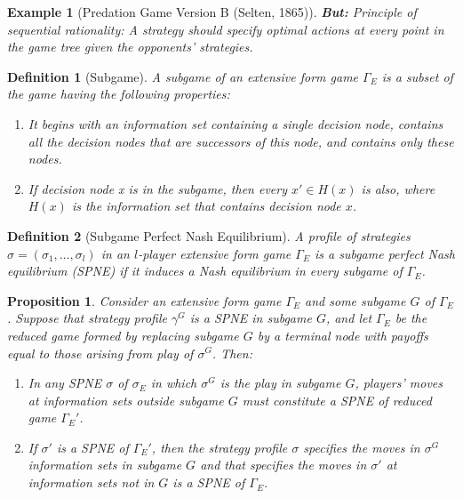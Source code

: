 \documentclass[12pt]{extreport} %
\theoremstyle{named}
\theoremstyle{itshape}
\newtheorem*{definition}{Definition}
\theoremstyle{normal}
\newtheorem{example}[unnamedtheorem]{Example}
\newtheorem{proposition}[unnamedtheorem]{Proposition}
\begin{document}
\begin{example}[Predation Game Version B (Selten, 1865)]
	\textbf{But:} Principle of sequential rationality: A strategy should specify optimal actions at every point in the game tree given the opponents’ strategies.
\end{example}

\begin{definition}[Subgame]
	A subgame of an extensive form game $\Gamma_E$ is a subset of the game having the following properties:
	\begin{enumerate}
		\item It begins with an information set containing a single decision node, contains all the decision nodes that are successors of this node, and contains only these nodes.
		\item If decision node x is in the subgame, then every $x' \in H(x)$ is also, where $H(x)$ is the information set that contains decision node $x$.
	\end{enumerate}
\end{definition} 

\begin{definition}[Subgame Perfect Nash Equilibrium]
	A profile of strategies $\sigma = (\sigma_1, \dotsc, \sigma_l)$ in an $l$-player extensive form game $\Gamma_E$ is a subgame perfect Nash equilibrium (SPNE) if it induces a Nash equilibrium in every subgame of $\Gamma_E$.	
\end{definition}

\begin{proposition}
	Consider an extensive form game $\Gamma_E$ and some subgame $G$ of $\Gamma_E$. Suppose that strategy profile $\gamma^G$ is a SPNE in subgame $G$, and let $\Gamma_E$ be the reduced game formed by replacing subgame $G$ by a terminal node with payoffs equal to those arising from play of $\sigma^G$. Then:
	\begin{enumerate}
		\item In any SPNE $\sigma$ of $\sigma_E$ in which $\sigma^G$ is the play in subgame $G$, players’ moves at information sets outside subgame $G$ must constitute a SPNE of reduced game $\Gamma_E'$.
		\item If $\sigma'$ is a SPNE of $\Gamma_E'$, then the strategy profile $\sigma$ specifies the moves in $\sigma^G$ information sets in subgame $G$ and that specifies the moves in $\sigma'$ at information sets not in $G$ is a SPNE of $\Gamma_E$.
	\end{enumerate}
\end{proposition}
\end{document}

